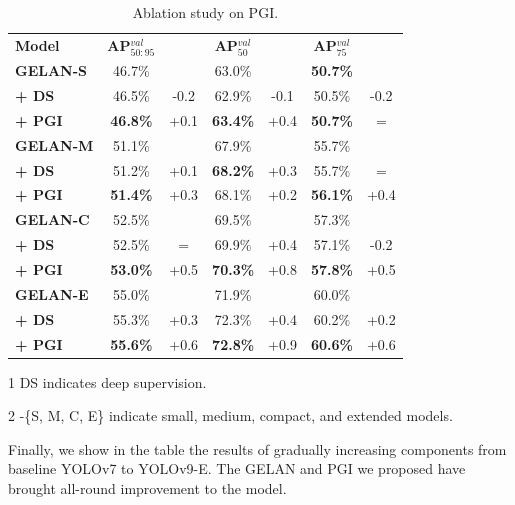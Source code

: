\documentclass[10pt,twocolumn,letterpaper]{article}
\begin{document}
	\begin{table}[h]
		\centering
		\begin{threeparttable}[h]
			\footnotesize
			\caption{Ablation study on PGI.}
			\label{table:scale}
			\setlength\tabcolsep{5.5pt}
			\begin{tabular}{lcccccc}
				\toprule
				\textbf{Model} & \textbf{AP$^{val}_{50:95}$} &  & \textbf{AP$^{val}_{50}$} &  & \textbf{AP$^{val}_{75}$} &  \\
				\textbf{GELAN-S} & 46.7\% &  & 63.0\% &  & \textbf{50.7\%} &  \\
				\textbf{+ DS} & 46.5\% & -0.2 & 62.9\% & -0.1 & 50.5\% & -0.2 \\
				\textbf{+ PGI} & \textbf{46.8\%} & +0.1 & \textbf{63.4\%} & +0.4 & \textbf{50.7\%} & = \\
				\midrule
				\textbf{GELAN-M} & 51.1\% &  & 67.9\% &  & 55.7\% &  \\
				\textbf{+ DS} & 51.2\% & +0.1 & \textbf{68.2\%} & +0.3 & 55.7\% & = \\
				\textbf{+ PGI} & \textbf{51.4\%} & +0.3 & 68.1\% & +0.2 & \textbf{56.1\%} & +0.4 \\
				\midrule
				\textbf{GELAN-C} & 52.5\% &  & 69.5\% &  & 57.3\% &  \\
				\textbf{+ DS} & 52.5\% & = & 69.9\% & +0.4 & 57.1\% & -0.2 \\
				\textbf{+ PGI} & \textbf{53.0\%} & +0.5 & \textbf{70.3\%} & +0.8 & \textbf{57.8\%} & +0.5 \\
				\midrule
				\textbf{GELAN-E} & 55.0\% &  & 71.9\% &  & 60.0\% &  \\
				\textbf{+ DS} & 55.3\% & +0.3 & 72.3\% & +0.4 & 60.2\% & +0.2 \\
				\textbf{+ PGI} & \textbf{55.6\%} & +0.6 & \textbf{72.8\%} & +0.9 & \textbf{60.6\%} & +0.6 \\
				\bottomrule
			\end{tabular}
			\begin{tablenotes}[flushleft]
				\footnotesize
				\item[1] DS indicates deep supervision.
				\item[2] -\{S, M, C, E\} indicate small, medium, compact, and extended models.
			\end{tablenotes}
		\end{threeparttable}
	\end{table}

	\newpage
	
	Finally, we show in the table the results of gradually increasing components from baseline YOLOv7 to YOLOv9-E.  The GELAN and PGI we proposed have brought all-round improvement to the model.
\end{document}

